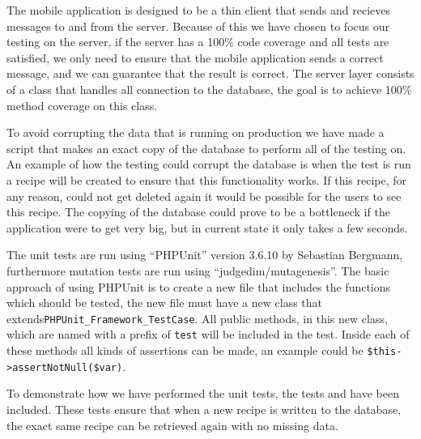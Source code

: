 The mobile application is designed to be a thin client that sends and recieves messages to and from the server. Because of this we have chosen to focus our testing on the server, if the server has a 100\% code coverage and all tests are satisfied, we only need to ensure that the mobile application sends a correct message, and we can guarantee that the result is correct.
The server layer consists of a class that handles all connection to the database, the goal is to achieve 100\% method coverage on this class.

To avoid corrupting the data that is running on production we have made a script that makes an exact copy of the database to perform all of the testing on. An example of how the testing could corrupt the database is when the test is run a recipe will be created to ensure that this functionality works. If this recipe, for any reason, could not get deleted again it would be possible for the users to see this recipe. The copying of the database could prove to be a bottleneck if the application were to get very big, but in current state it only takes a few seconds.

The unit tests are run using ``PHPUnit'' version 3.6.10 by Sebastian Bergmann\cite{phpunit}, furthermore mutation tests are run using ``judgedim/mutagenesis''\cite{mutagenesis}. The basic approach of using PHPUnit is to create a new file that includes the functions which should be tested, the new file must have a new class that extends\linebreak \lstinline|PHPUnit_Framework_TestCase|. All public methods, in this new class, which are named with a prefix of \lstinline|test| will be included in the test. Inside each of these methods all kinds of assertions can be made, an example could be \lstinline|$this->assertNotNull($var)|\citep{phpunit}.

To demonstrate how we have performed the unit tests, the tests  and  have been included. These tests ensure that when a new recipe is written to the database, the exact same recipe can be retrieved again with no missing data.


